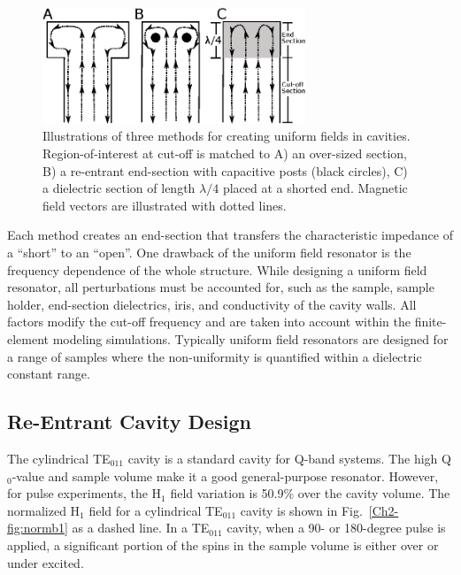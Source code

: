 \begin{figure}[htb]
 \centering
 \includegraphics[width=0.7\textwidth]{Kapitel/Ch2-Images/02-UFIllustration.eps}
 \caption[Methods for creating uniform fields in cavities.]{Illustrations of three methods for creating uniform fields in cavities. Region-of-interest at cut-off is matched to A) an  over-sized section, B) a re-entrant end-section with capacitive posts (black circles), C) a dielectric section of length $\lambda/4$ placed at a shorted end. Magnetic field vectors are illustrated with dotted lines.}
 \label{fig:UFmethods}
\end{figure}

Each method creates an end-section that transfers the characteristic impedance of a ``short'' to an ``open''. One drawback of the uniform field resonator is the frequency dependence of the whole structure. While designing a uniform field resonator, all perturbations must be accounted for, such as the sample, sample holder, end-section dielectrics, iris, and conductivity of the cavity walls. All factors modify the cut-off frequency and are taken into account within the finite-element modeling simulations. Typically uniform field resonators are designed for a range of samples where the non-uniformity is quantified within a dielectric constant range. 

\subsection{Re-Entrant \cylTE{} Cavity Design}
The cylindrical TE$_{011}$ cavity is a standard cavity for Q-band systems. The high Q$_0$-value and sample volume make it a good general-purpose resonator. However, for pulse experiments, the H$_1$ field variation is 50.9\% over the cavity volume. The normalized H$_1$ field for a cylindrical TE$_{011}$ cavity is shown in Fig.~\ref{Ch2-fig:normb1} as a dashed line. In a TE$_{011}$ cavity, when a 90- or 180-degree pulse is applied, a significant portion of the spins in the sample volume is either over or under excited. 


